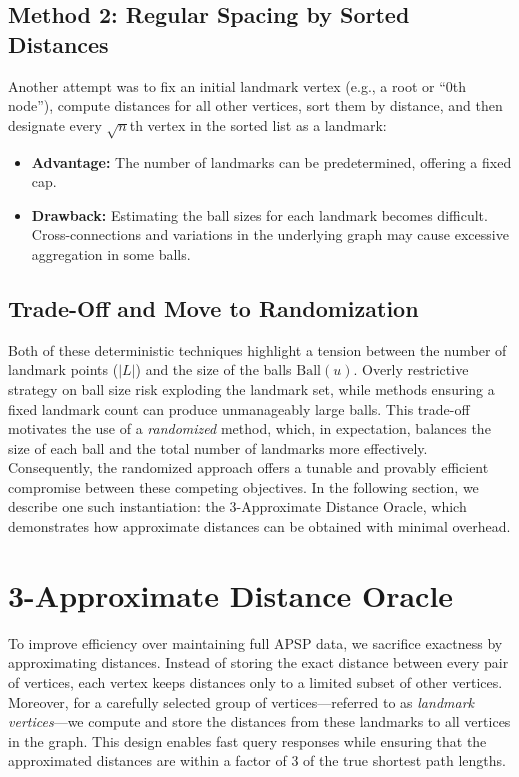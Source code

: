 \documentclass{article}
\begin{document}
\subsection{Method 2: Regular Spacing by Sorted Distances}
Another attempt was to fix an initial landmark vertex (e.g., a root or ``0th node''), compute distances for all other vertices, sort them by distance, and then designate every \(\sqrt{n}\)th vertex in the sorted list as a landmark:
\begin{itemize}
    \item \textbf{Advantage:} The number of landmarks can be predetermined, offering a fixed cap.
    \item \textbf{Drawback:} Estimating the ball sizes for each landmark becomes difficult. Cross-connections and variations in the underlying graph may cause excessive aggregation in some balls.
\end{itemize}

\subsection{Trade-Off and Move to Randomization}
Both of these deterministic techniques highlight a tension between the number of landmark points (\( |L| \)) and the size of the balls \(\text{Ball}(u)\). Overly restrictive strategy on ball size risk exploding the landmark set, while methods ensuring a fixed landmark count can produce unmanageably large balls. This trade-off motivates the use of a \emph{randomized} method, which, in expectation, balances the size of each ball and the total number of landmarks more effectively. Consequently, the randomized approach offers a tunable and provably efficient compromise between these competing objectives. In the following section, we describe one such instantiation: the 3-Approximate Distance Oracle, which demonstrates how approximate distances can be obtained with minimal overhead.

\section{3-Approximate Distance Oracle}
To improve efficiency over maintaining full APSP data, we sacrifice exactness by approximating distances. Instead of storing the exact distance between every pair of vertices, each vertex keeps distances only to a limited subset of other vertices. Moreover, for a carefully selected group of vertices—referred to as \emph{landmark vertices}—we compute and store the distances from these landmarks to all vertices in the graph. This design enables fast query responses while ensuring that the approximated distances are within a factor of 3 of the true shortest path lengths.
\end{document}
